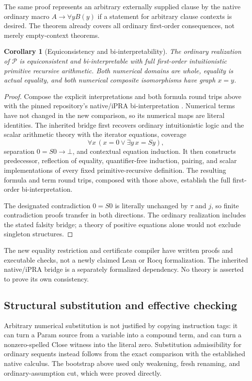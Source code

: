 \documentclass[11pt,letterpaper]{article}
\newtheorem{corollary}[theorem]{Corollary}
\begin{document}
The same proof represents an arbitrary externally supplied clause by
the native ordinary macro $A\to\forall yB(y)$ if a statement for arbitrary
clause contexts is desired.  The theorem already covers all ordinary
first-order consequences, not merely empty-context theorems.

\begin{corollary}[Equiconsistency and bi-interpretability]
The ordinary realization of $\mathcal P$ is equiconsistent and
bi-interpretable with full first-order intuitionistic primitive recursive
arithmetic.  Both numerical domains are whole, equality is actual
equality, and both numerical composite isomorphisms have graph $x=y$.
\end{corollary}
\begin{proof}
Compose the explicit interpretations and both formula round trips above
with the pinned repository's native/iPRA bi-interpretation
\cite{nativebiinterp}.  Numerical terms have not changed in the new
comparison, so its numerical maps are literal identities.  The inherited
bridge first recovers ordinary intuitionistic logic and the scalar
arithmetic theory with the iterator equations, coverage
\[
 \forall x\,(x=0\lor\exists y\,x=Sy),
\]
separation $0=S0\to\bot$, and contextual equation induction.  It then
constructs predecessor, reflection of equality, quantifier-free induction,
pairing, and scalar implementations of every fixed primitive-recursive
definition.  The resulting formula and term round trips, composed with
those above, establish the full first-order bi-interpretation.

The designated contradiction $0=S0$ is literally unchanged by $\tau$
and $j$, so finite contradiction proofs transfer in both directions.
The ordinary realization includes the stated falsity bridge; a theory
of positive equations alone would not exclude singleton structures.
\end{proof}

The new equality restriction and certificate compiler have written proofs
and executable checks, not a newly claimed Lean or Rocq formalization.
The inherited native/iPRA bridge is a separately formalized dependency.
No theory is asserted to prove its own consistency.

\subsection{Structural substitution and effective checking}

Arbitrary numerical substitution is not justified by copying instruction
tags: it can turn a Param source from a variable into a compound term,
and can turn a nonzero-spelled Close witness into the literal zero.
Substitution admissibility for ordinary sequents instead follows from the
exact comparison with the established native calculus.  The bootstrap
above used only weakening, fresh renaming, and ordinary-assumption cut,
which were proved directly.
\end{document}
